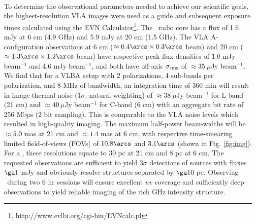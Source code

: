 \documentclass[11pt]{article}
\begin{document}
\\

To determine the observational parameters needed to achieve our
scientific goals, the highest-resolution VLA images were used as a
guide and subsequent exposure times calculated using the EVN
Calculator\footnote{http://www.evlbi.org/cgi-bin/EVNcalc.pl}. The
\irs\ radio core has a flux of 1.6 mJy at 6 cm (4.9 GHz) and 5.9 mJy
at 20 cm (1.5 GHz). The VLA A-configuration observations at 6 cm
($\approx 0.4\arcs \times 0.3\arcs$ beam) and 20 cm ($\approx 1.3\arcs
\times 1.2\arcs$ beam) have respective peak flux densities of 1.0 mJy
beam$^{-1}$ and 4.6 mJy beam$^{-1}$, and both have off-axis
$\sigma_{\rm{rms}}$ of $\approx 35 ~\mu$Jy beam$^{-1}$. We find that
for a VLBA setup with 2 polarizations, 4 sub-bands per polarization,
and 8 MHz of bandwidth, an integration time of 360 min will result in
image thermal noise ($1\sigma$; natural weighting) of $\approx 38
~\mu$Jy beam$^{-1}$ for L-band (21 cm) and $\approx 40 ~\mu$Jy
beam$^{-1}$ for C-band (6 cm) with an aggregate bit rate of 256 Mbps
(2 bit sampling). This is comparable to the VLA noise levels which
resulted in high-quality imaging. The maximum half-power beam-widths
will be $\approx 5.0$ mas at 21 cm and $\approx 1.4$ mas at 6 cm, with
respective time-smearing limited field-of-views (FOVs) of $10.8\arcs$
and $3.1\arcs$ (shown in Fig. \ref{fig:img}). For a \cosmo, these
resolutions equate to 30 pc at 21 cm and 8 pc at 6 cm. The requested
observations are sufficient to yield $3\sigma$ detections of sources
with fluxes $\ga 1$ mJy and obviously resolve structures separated by
$\ga 10$ pc. Observing \irs\ during two 6 hr sessions will ensure
excellent $uv$ coverage and sufficiently deep observations to yield
reliable imaging of the rich GHz intensity structure.\\
\end{document}
